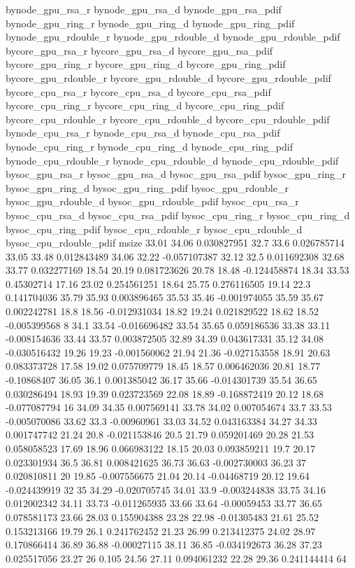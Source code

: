 bynode_gpu_rsa_r	bynode_gpu_rsa_d	bynode_gpu_rsa_pdif	bynode_gpu_ring_r	bynode_gpu_ring_d	bynode_gpu_ring_pdif	bynode_gpu_rdouble_r	bynode_gpu_rdouble_d	bynode_gpu_rdouble_pdif	bycore_gpu_rsa_r	bycore_gpu_rsa_d	bycore_gpu_rsa_pdif	bycore_gpu_ring_r	bycore_gpu_ring_d	bycore_gpu_ring_pdif	bycore_gpu_rdouble_r	bycore_gpu_rdouble_d	bycore_gpu_rdouble_pdif	bycore_cpu_rsa_r	bycore_cpu_rsa_d	bycore_cpu_rsa_pdif	bycore_cpu_ring_r	bycore_cpu_ring_d	bycore_cpu_ring_pdif	bycore_cpu_rdouble_r	bycore_cpu_rdouble_d	bycore_cpu_rdouble_pdif	bynode_cpu_rsa_r	bynode_cpu_rsa_d	bynode_cpu_rsa_pdif	bynode_cpu_ring_r	bynode_cpu_ring_d	bynode_cpu_ring_pdif	bynode_cpu_rdouble_r	bynode_cpu_rdouble_d	bynode_cpu_rdouble_pdif	bysoc_gpu_rsa_r	bysoc_gpu_rsa_d	bysoc_gpu_rsa_pdif	bysoc_gpu_ring_r	bysoc_gpu_ring_d	bysoc_gpu_ring_pdif	bysoc_gpu_rdouble_r	bysoc_gpu_rdouble_d	bysoc_gpu_rdouble_pdif	bysoc_cpu_rsa_r	bysoc_cpu_rsa_d	bysoc_cpu_rsa_pdif	bysoc_cpu_ring_r	bysoc_cpu_ring_d	bysoc_cpu_ring_pdif	bysoc_cpu_rdouble_r	bysoc_cpu_rdouble_d	bysoc_cpu_rdouble_pdif	msize
33.01	34.06	0.030827951	32.7	33.6	0.026785714	33.05	33.48	0.012843489	34.06	32.22	-0.057107387	32.12	32.5	0.011692308	32.68	33.77	0.032277169	18.54	20.19	0.081723626	20.78	18.48	-0.124458874	18.34	33.53	0.45302714	17.16	23.02	0.254561251	18.64	25.75	0.276116505	19.14	22.3	0.141704036	35.79	35.93	0.003896465	35.53	35.46	-0.001974055	35.59	35.67	0.002242781	18.8	18.56	-0.012931034	18.82	19.24	0.021829522	18.62	18.52	-0.005399568	8
34.1	33.54	-0.016696482	33.54	35.65	0.059186536	33.38	33.11	-0.008154636	33.44	33.57	0.003872505	32.89	34.39	0.043617331	35.12	34.08	-0.030516432	19.26	19.23	-0.001560062	21.94	21.36	-0.027153558	18.91	20.63	0.083373728	17.58	19.02	0.075709779	18.45	18.57	0.006462036	20.81	18.77	-0.10868407	36.05	36.1	0.001385042	36.17	35.66	-0.014301739	35.54	36.65	0.030286494	18.93	19.39	0.023723569	22.08	18.89	-0.168872419	20.12	18.68	-0.077087794	16
34.09	34.35	0.007569141	33.78	34.02	0.007054674	33.7	33.53	-0.005070086	33.62	33.3	-0.00960961	33.03	34.52	0.043163384	34.27	34.33	0.001747742	21.24	20.8	-0.021153846	20.5	21.79	0.059201469	20.28	21.53	0.058058523	17.69	18.96	0.066983122	18.15	20.03	0.093859211	19.7	20.17	0.023301934	36.5	36.81	0.008421625	36.73	36.63	-0.002730003	36.23	37	0.020810811	20	19.85	-0.007556675	21.04	20.14	-0.04468719	20.12	19.64	-0.024439919	32
35	34.29	-0.020705745	34.01	33.9	-0.003244838	33.75	34.16	0.012002342	34.11	33.73	-0.011265935	33.66	33.64	-0.00059453	33.77	36.65	0.078581173	23.66	28.03	0.155904388	23.28	22.98	-0.01305483	21.61	25.52	0.153213166	19.79	26.1	0.241762452	21.23	26.99	0.213412375	24.02	28.97	0.170866414	36.89	36.88	-0.00027115	38.11	36.85	-0.034192673	36.28	37.23	0.025517056	23.27	26	0.105	24.56	27.11	0.094061232	22.28	29.36	0.241144414	64
